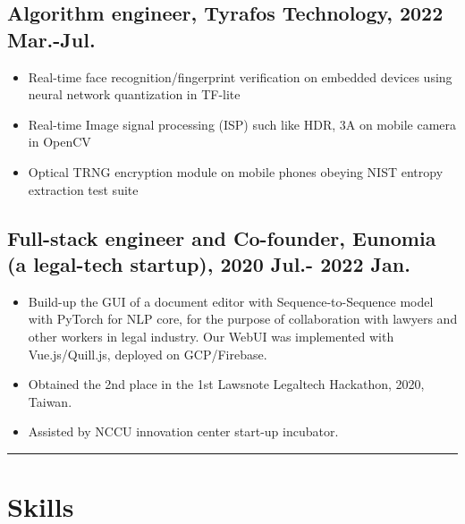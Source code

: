 \documentclass[11pt]{article}
\begin{document}
\begin{multicols*}{2}
\vspace{0.8em}

\subsection*{\textbf{Algorithm engineer}, Tyrafos Technology, 2022 Mar.-Jul.}
\begin{itemize}[noitemsep]
    \item Real-time face recognition/fingerprint verification on embedded devices using neural network quantization in TF-lite
    \item Real-time Image signal processing (ISP) such like HDR, 3A on mobile camera in OpenCV
    \item Optical TRNG encryption module on mobile phones obeying NIST entropy extraction test suite
\end{itemize}

\vspace{0.8em}

\subsection*{Full-stack engineer and Co-founder, Eunomia (a legal-tech startup), 2020 Jul.- 2022 Jan.}
\begin{itemize}[noitemsep]
    \item Build-up the GUI of a document editor with Sequence-to-Sequence model with PyTorch for NLP core, for the purpose of collaboration with lawyers and other workers in legal industry. Our WebUI was implemented with Vue.js/Quill.js, deployed on GCP/Firebase.
    \item Obtained the 2nd place in the 1st Lawsnote Legaltech Hackathon, 2020, Taiwan.
    \item Assisted by NCCU innovation center start-up incubator.
\end{itemize}

\hrule

\section*{Skills}

\end{multicols*}
\end{document}

